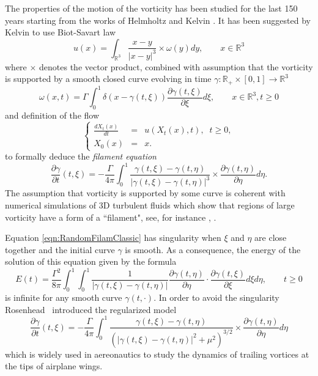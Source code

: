 \documentclass[11pt,a4paper,reqno]{amsart}%
\theoremstyle{plain}
\theoremstyle{remark}
\theoremstyle{plain}
\numberwithin{equation}{section}
\begin{document}
The properties of the motion of the vorticity has been studied for the last 150 years starting from the works of
Helmholtz \cite{Helm1858} and Kelvin \cite{Kelvin1869}. It has been suggested by Kelvin  to use Biot-Savart law
\[
{u}({x})=\int_{\mathbb{R}^3}\frac{{x}-{y}}{\vert {x}-{y}\vert^3}\times{\omega}({y})d{y},\qquad{x}\in\mathbb{R}^3
\]
where $\times$ denotes the vector product, 
combined with assumption that the vorticity is supported by a smooth closed curve evolving in time $\gamma:\mathbb{R}_+\times[0,1]\to\mathbb{R}^3$
\[
\omega({x},t)=\Gamma\int_0^1\delta({x}-\gamma(t,\xi))\frac{\partial \gamma(t,\xi)}{\partial \xi}d\xi,\qquad x\in\mathbb{R}^3,t\geq 0
\]
and definition of the flow
\begin{equation}\label{equa21}
\left\{
\begin{array}{rcl}
\frac{d {X}_t({x})}{dt}&=&{u}({X}_t({x}),t),\;\;t\geq 0,\\
{X}_0({x})&=&{x}.
\end{array}
\right.
\end{equation}
to formally deduce the \emph{filament equation}
\begin{equation}\label{eqn:RandomFilamClassic}
\frac{\partial \gamma}{\partial t}(t,\xi)=-\frac{\Gamma}{4\pi}\int_0^1\frac{\gamma(t,\xi)-\gamma(t,\eta)}{\vert \gamma(t,\xi)-\gamma(t,\eta)\vert^3}\times\frac{\partial\gamma(t,\eta)}{\partial \eta}d\eta.
\end{equation}
The assumption that vorticity is supported by some curve is coherent with numerical simulations of 3D turbulent fluids
which show that regions of large  vorticity   have a form of a
``filament", see, for instance \cite{[Bell+Markus_1992]},
\cite{[VincMeneguzzi-1991]}.

Equation \eqref{eqn:RandomFilamClassic} has singularity when $\xi$ and $\eta$ are close together and the initial curve $\gamma$ is smooth.
As a consequence, the energy of the solution of this equation given by the formula
\[
E(t)=\frac{\Gamma^2}{8\pi}\int_0^1\int_0^1\frac{1}{\vert \gamma(t,\xi)-\gamma(t,\eta)\vert }\frac{\partial \gamma(t,\eta)}{\partial \eta}\cdot\frac{\partial \gamma(t,\xi)}{\partial \xi}d\xi d\eta ,\qquad t\geq 0
\]
is infinite for any smooth curve $\gamma(t,\cdot)$. In order to avoid the singularity
Rosenhead~\cite{[Rosenhead-1930]}  introduced the regularized  model
\begin{equation}\label{eqn:RandomFilamRosenhead}
\frac{\partial \gamma}{\partial t}(t,\xi)=-\frac{\Gamma}{4\pi}\int_0^1\frac{\gamma(t,\xi)-\gamma(t,\eta)}{(\vert \gamma(t,\xi)-\gamma(t,\eta)\vert^2+\mu^2)^{3/2}}\times\frac{\partial\gamma(t,\eta)}{\partial \eta}d\eta
\end{equation}
which is widely used in aereonautics to study the dynamics of trailing vortices at the tips of airplane wings.
\end{document}
